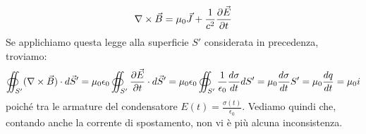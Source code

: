 \begin{equation}
	\nabla\times\vec{B} = \mu_0 \vec{J} + \frac{1}{c^2} \frac{\partial\vec{E}}{\partial t}
	\label{eq:48}
\end{equation}
%
Se applichiamo questa legge alla superficie $ S' $ considerata in precedenza, troviamo:
\begin{equation}
	\oiint_{S'} (\nabla\times\vec{B}) \cdot d\vec{S}' = \mu_0 \epsilon_0 \oiint_{S'} \frac{\partial\vec{E}}{\partial t} \cdot d\vec{S}' = \mu_0 \epsilon_0 \oiint_{S'} \frac{1}{\epsilon_0} \frac{d\sigma}{dt} dS' = \mu_0 \frac{d\sigma}{dt} S' = \mu_0 \frac{dq}{dt} = \mu_0 i
	\label{eq:49}
\end{equation}
poiché tra le armature del condensatore $ E(t) = \frac{\sigma(t)}{\epsilon_0} $. Vediamo quindi che, contando anche la corrente di spostamento, non vi è più alcuna inconsistenza.
